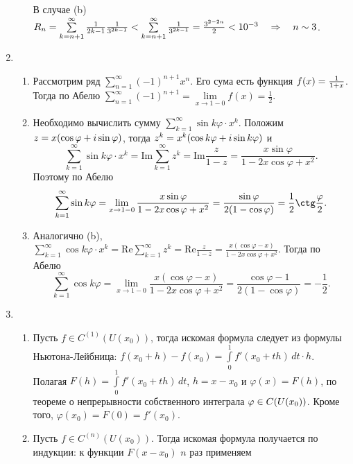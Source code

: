 \documentclass[a4paper]{article}
\newcommand*{\p}[1]{#1\nobreak\discretionary{}{\hbox{$\mathsurround=0pt #1$}}{}}
\begin{document}
\begin{enumerate}
\begin{enumerate}
          В случае (b) $R_n=\sum\limits_{k=n+1}^\infty\frac{1}{2k-1}\frac{1}{3^{2k-1}}<
          \sum\limits_{k=n+1}^\infty\frac{1}{3^{2k-1}}=\frac{3^{2-2n}}{2}\p<10^{-3}\quad\Rightarrow\quad
          n\sim3$.
        \end{enumerate}
  \item \begin{enumerate}
          \item Рассмотрим ряд
          $\sum\limits_{n=1}^\infty(-1)^{n+1}x^n$. Его сума есть
          функция $f(x)\p=\frac{1}{1+x}$. Тогда по Абелю $\sum\limits_{n=1}^\infty(-1)^{n+1}=
          \lim\limits_{x\rightarrow1-0}f(x)=\frac{1}{2}$.
          \item Необходимо вычислить сумму $\sum\limits_{k=1}^\infty\sin k\varphi\cdot
          x^k$. Положим $z\p=x(\cos\varphi\p+i\sin\varphi)$, тогда $z^k\p=x^k(\cos k\varphi\p+
          i\sin k\varphi)$ и $$\sum\limits_{k=1}^\infty\sin k\varphi\cdot x^k=
          \mathrm{Im}\sum\limits_{k=1}^\infty z^k=\mathrm{Im}\frac{z}{1-z}
          =\frac{x\sin\varphi}{1-2x\cos\varphi+x^2}.$$
          Поэтому по Абелю $$\sum\limits_{k=1}^\infty\sin k\varphi=\lim\limits_{x\rightarrow1-0}
          \frac{x\sin\varphi}{1-2x\cos\varphi+x^2}=\frac{\sin\varphi}{2(1-\cos\varphi)}=
          \frac{1}{2}\ctg\frac{\varphi}{2}.$$
          \item Аналогично (b), $\sum\limits_{k=1}^\infty\cos k\varphi\cdot x^k=
          \mathrm{Re}\sum\limits_{k=1}^\infty z^k=\mathrm{Re}\frac{z}{1-z}
          =\frac{x(\cos\varphi-x)}{1-2x\cos\varphi+x^2}$. Тогда по
          Абелю $$\sum\limits_{k=1}^\infty\cos k\varphi=\lim\limits_{x\rightarrow1-0}
          \frac{x(\cos\varphi-x)}{1-2x\cos\varphi+x^2}=\frac{\cos\varphi-1}{2(1-\cos\varphi)}=
          -\frac{1}{2}.$$
        \end{enumerate}
  \item \begin{enumerate}
          \item Пусть $f\in C^{(1)}(U(x_0))$, тогда искомая формула следует из
                формулы Ньютона-Лейбница: $f(x_0+h)-f(x_0)=\int\limits_0^1\!f'(x_0+th)\,dt\cdot
                h$. Полагая $F(h)=\int\limits_0^1\!f'(x_0+th)\,dt$, $h=x-x_0$ и
                $\varphi(x)=F(h)$, по теореме о непрерывности собственного
                интеграла $\varphi\p\in C(U(x_0))$. Кроме того,
                $\varphi(x_0)=F(0)=f'(x_0)$.
          \item Пусть $f\in C^{(n)}(U(x_0))$. Тогда искомая формула
          получается по индукции: к функции $F(x-x_0)$ $n$ раз применяем

\end{enumerate}
\end{enumerate}
\end{document}
